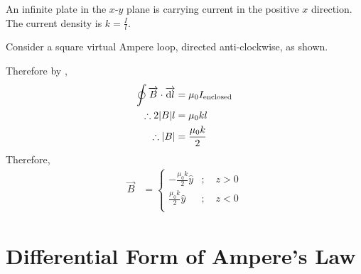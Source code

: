 \documentclass[fleqn, a4paper, 12pt, twoside]{article}
\theoremstyle{definition}
\theoremstyle{theorem}
\begin{document}
\begin{question}
	An infinite plate in the $x$-$y$ plane is carrying current in the positive $x$ direction.
	The current density is $k = \frac{I}{l}$.
\end{question}

\begin{solution}
	Consider a square virtual Ampere loop, directed anti-clockwise, as shown.
	\begin{figure}[H]
	\end{figure}
	Therefore by ,
	\begin{align*}
		\oint \overrightarrow{B} \cdot \overrightarrow{\dif l} &= \mu_0 I_{\textnormal{enclosed}}\\
		\therefore 2 |B| l &= \mu_0 k l\\
		\therefore |B| &= \frac{\mu_0 k}{2}
	\end{align*}
	Therefore,
	\begin{align*}
		\overrightarrow{B} &=
			\begin{cases}
				-\frac{\mu_0 k}{2} \hat{y} & ;\quad z > 0 \\
				\frac{\mu_0 k}{2} \hat{y}  & ;\quad z < 0 \\
			\end{cases}
	\end{align*}
\end{solution}

\section{Differential Form of Ampere's Law}
\end{document}
